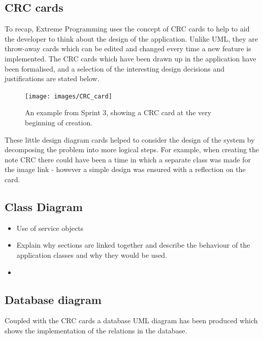 \subsection{CRC cards}
To recap, Extreme Programming uses the concept of CRC cards to help to aid the developer to think about the design of the application. Unlike UML, they are throw-away cards which can be edited and changed every time a new feature is implemented. The CRC cards which have been drawn up in the application have been formalised, and a selection of the interesting design decisions and justifications are stated below.

\begin{figure}[h]
  \centering
  \texttt{[image: images/CRC\_card]}
  \caption{An example from Sprint 3, showing a CRC card at the very beginning of creation.}
  \label{fig:crc1}
\end{figure}

These little design diagram cards helped to consider the design of the system by decomposing the problem into more logical steps. For example, when creating the note CRC there could have been a time in which a separate class was made for the image link - however a simple design was ensured with a reflection on the card.

\subsection{Class Diagram}
 
\begin{itemize}
  \item Use of service objects
  \item Explain why sections are linked together and describe the behaviour of the application classes and why they would be used.
  \item
\end{itemize}

\subsection{Database diagram}
Coupled with the CRC cards a database UML diagram has been produced which shows the implementation of the relations in the database.

